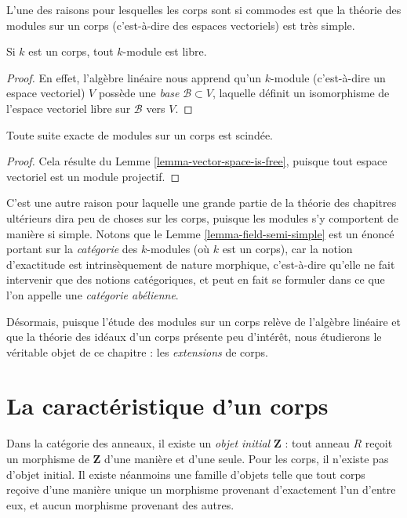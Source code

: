 \noindent
L'une des raisons pour lesquelles les corps sont si commodes est que la théorie des modules sur un corps
(c'est-à-dire des espaces vectoriels) est très simple.

\begin{lemma}
\label{lemma-vector-space-is-free}
Si $k$ est un corps, tout $k$-module est libre.
\end{lemma}

\begin{proof}
En effet, l'algèbre linéaire nous apprend qu'un $k$-module (c'est-à-dire un espace vectoriel)
$V$ possède une {\it base} $\mathcal{B} \subset V$, laquelle définit un isomorphisme
de l'espace vectoriel libre sur $\mathcal{B}$ vers $V$.
\end{proof}

\begin{lemma}
\label{lemma-field-semi-simple}
Toute suite exacte de modules sur un corps est scindée.
\end{lemma}

\begin{proof}
Cela résulte du Lemme \ref{lemma-vector-space-is-free}, puisque tout espace
vectoriel est un module projectif.
\end{proof}

\noindent
C'est une autre raison pour laquelle une grande partie de la théorie des chapitres ultérieurs dira
peu de choses sur les corps, puisque les modules s'y comportent de manière si simple.
Notons que le Lemme \ref{lemma-field-semi-simple} est un énoncé portant sur la
{\it catégorie} des $k$-modules (où $k$ est un corps), car la notion
d'exactitude est intrinsèquement de nature morphique, c'est-à-dire qu'elle ne fait intervenir que des notions
catégoriques, et peut en fait se formuler dans ce que l'on appelle une {\it catégorie abélienne}.

\medskip\noindent
Désormais, puisque l'étude des modules sur un corps relève de l'algèbre linéaire et
que la théorie des idéaux d'un corps présente peu d'intérêt, nous étudierons le véritable
objet de ce chapitre : les {\it extensions} de corps.


\section{La caractéristique d’un corps}
\label{section-more-fields}

\noindent
Dans la catégorie des anneaux, il existe un {\it objet initial} $\mathbf{Z}$ : tout
anneau $R$ reçoit un morphisme de $\mathbf{Z}$ d'une manière et d'une seule. Pour les corps,
il n'existe pas d'objet initial.
Il existe néanmoins une famille d'objets telle que tout corps reçoive d'une manière
unique un morphisme provenant d'exactement l'un d'entre eux, et aucun morphisme provenant des autres.


